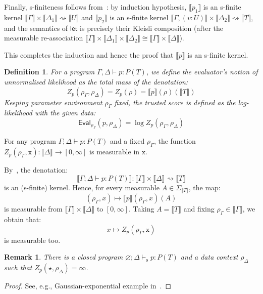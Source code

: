 \documentclass[preprint]{uai2026} %
\newtheorem{definition}{Definition}
\newtheorem{remark}{Remark}
\newcommand{\emptyctx}{\varnothing}
\newcommand{\sem}[1]{\llbracket #1 \rrbracket}
\newcommand{\kto}{\rightsquigarrow}
\newcommand{\safevdash}{\vdash_{\text{s}}}
\newcommand{\datavar}[1]{\mathtt{#1}}
\newcommand{\TEval}{\mathsf{Eval}}
\begin{document}
\begin{proofE}
\begin{itemize}
Finally, s-finiteness follows from~: by induction hypothesis, $\sem{p_1}$ is an s-finite kernel
$\sem{\Gamma}\times\sem{\Delta_1}\kto \sem{U}$ and $\sem{p_2}$ is an s-finite kernel
$\sem{\Gamma,(v:U)}\times\sem{\Delta_2}\kto \sem{T}$, and the semantics of $\mathsf{let}$ is precisely their Kleisli
composition (after the measurable re-association $\sem{\Gamma}\times\sem{\Delta_1}\times\sem{\Delta_2}\cong \sem{\Gamma}\times\sem{\Delta}$).
\end{itemize}

This completes the induction and hence the proof that $\sem{p}$ is an s-finite kernel.
\end{proofE}

\begin{definition}\label{def:ZZ}
For a program $\Gamma, \Delta \vdash p: P(T)$, we define the evaluator's notion of unnormalised likelihood as the total mass of the denotation:
\[
Z_p(\rho_\Gamma, \rho_\Delta) = Z_p(\rho) = \sem{p}(\rho)(\sem{T})
\]
Keeping parameter environment  $\rho_\Gamma$ fixed, the trusted score is defined as the log-likelihood with the given data:
\[
\TEval_{\rho_\Gamma}(p,\rho_\Delta) = \log Z_p(\rho_\Gamma,\rho_\Delta)
\]
\end{definition}

\begin{propositionE}\label{prop:sem-is-meas}
    For any program $\Gamma; \Delta \vdash p: P(T)$ and a fixed $\rho_\Gamma$, the function $Z_p(\rho_\Gamma, \datavar{x}): \sem{\Delta} \to [0, \infty]$ is measurable in $\datavar{x}$.
\end{propositionE}
\begin{proofE}
By~, the denotation:
\[
\sem{\Gamma;\Delta \vdash p:P(T)}:\sem{\Gamma}\times\sem{\Delta}\kto\sem{T}
\]
is an (s-finite) kernel. Hence, for every measurable $A\in\Sigma_{\sem{T}}$, the map:
\[
(\rho_\Gamma,x)\longmapsto \sem{p}(\rho_\Gamma,x)(A)
\]
is measurable from $\sem{\Gamma}\times\sem{\Delta}$ to $[0,\infty]$.
Taking $A=\sem{T}$ and fixing $\rho_\Gamma \in 
\sem{\Gamma}$, we obtain that:
\[
x\longmapsto Z_p(\rho_\Gamma,\datavar{x})
\]
is measurable too.
\end{proofE}

\begin{remark}
    There is a closed program $\emptyctx; \Delta \safevdash p: P(T)$ and a data context $\rho_\Delta$ such that $Z_p(\star, \rho_\Delta) = \infty$.
\end{remark}
\begin{proof}
    See, e.g., Gaussian-exponential example in~\cite{statonCommutativeSemanticsProbabilistic2017b}.
\end{proof}
% 
\end{document}
